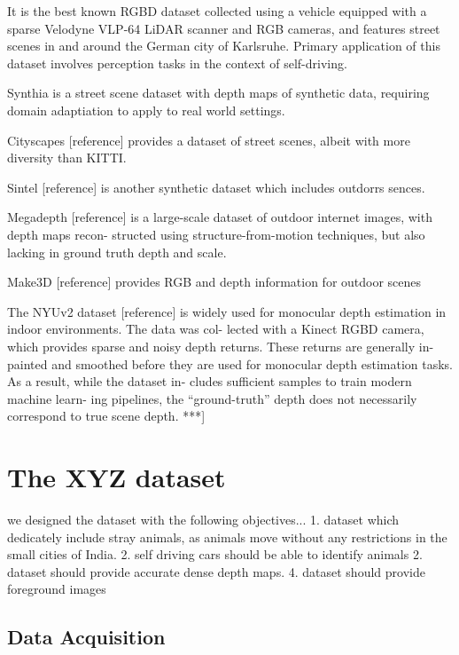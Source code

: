 \documentclass{article}
\begin{document}
It is the best known RGBD dataset collected using a vehicle equipped with a sparse Velodyne VLP-64 LiDAR scanner and RGB cameras, and features street scenes in and around the German city of Karlsruhe. Primary application of this dataset involves perception tasks in the context of self-driving.

Synthia is a street scene dataset with depth maps of synthetic data, requiring domain adaptiation to apply to real world settings. 

Cityscapes [reference] provides a dataset of street scenes, albeit with more diversity than KITTI.

Sintel [reference] is another synthetic dataset which includes outdorrs sences.

Megadepth [reference] is a large-scale dataset of outdoor internet images, with depth maps recon- structed using structure-from-motion techniques, but also lacking in ground truth depth and scale.

Make3D [reference] provides RGB and depth information for outdoor scenes

The NYUv2 dataset [reference] is widely used for monocular depth estimation in indoor environments. The data was col- lected with a Kinect RGBD camera, which provides sparse and noisy depth returns. These returns are generally in- painted and smoothed before they are used for monocular depth estimation tasks. As a result, while the dataset in- cludes sufficient samples to train modern machine learn- ing pipelines, the “ground-truth” depth does not necessarily correspond to true scene depth.
***]

\section{The XYZ dataset}
we designed the dataset with the following objectives...
1. dataset which dedicately include stray animals, as animals move without any restrictions in the small cities of India.
2. self driving cars should be able to identify animals
2. dataset should provide accurate dense depth maps.
4. dataset should provide foreground images

\subsection{Data Acquisition}
\end{document}
